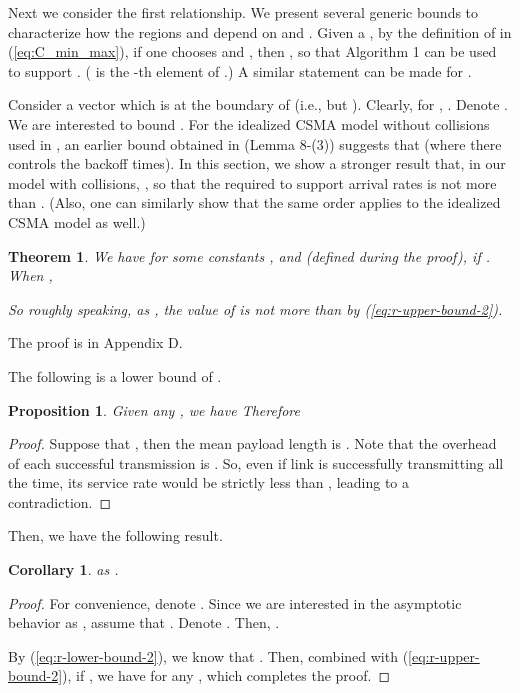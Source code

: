 \documentclass{IEEEtran}
\newtheorem{thm}{Theorem}
\newtheorem{cor}{Corollary}
\newtheorem{prop}{Proposition}
\begin{document}
Next we consider the first relationship. We present several generic
bounds to characterize how the regions 
and  depend on  and
. Given a , by the definition
of  in (\ref{eq:C_min_max}), if one chooses
 and ,
then , so that Algorithm
1 can be used to support . (
is the -th element of .) A similar
statement can be made for . 

Consider a vector  which is at the
boundary of  (i.e., 
but ).
Clearly, for , .
Denote . We are interested to bound .
For the idealized CSMA model without collisions used in \cite{Allerton},
an earlier bound obtained in \cite{joint_work} (Lemma 8-(3)) suggests
that 
(where  there controls the backoff times). In this section,
we show a stronger result that, in our model with collisions, ,
so that the required  to support arrival rates 
is not more than . (Also, one can similarly
show that the same order  applies to the idealized
CSMA model as well.)
\begin{thm}
\label{thm:collision}We have
for some constants ,  and  (defined during the proof),
if . When , 


So roughly speaking, as , the value of 
is not more than  by (\ref{eq:r-upper-bound-2}).
\end{thm}
The proof is in Appendix D.

The following is a lower bound of .
\begin{prop}
\label{thm:r-lower-bound-2}Given any ,
we have
Therefore
\end{prop}
\begin{proof}
Suppose that ,
then the mean payload length is .
Note that the overhead of each successful transmission is .
So, even if link  is successfully transmitting all the time, its
service rate would be strictly less than ,
leading to a contradiction. 
\end{proof}
Then, we have the following result.
\begin{cor}

as .\end{cor}
\begin{proof}
For convenience, denote .
Since we are interested in the asymptotic behavior as ,
assume that . Denote .
Then, . 

By (\ref{eq:r-lower-bound-2}), we know that .
Then, combined with (\ref{eq:r-upper-bound-2}), if ,
we have for any ,
which completes the proof.\begin{comment}
\emph{Remark}: The value of  can be computed by (\ref{eq:b}).
But it may be computationally expensive if  is large. Obtaining
a simpler expression for  is interesting for future work. However,
the above result suffices to show that 
is smaller than .
\end{comment}
{}
\end{proof}
\end{document}
